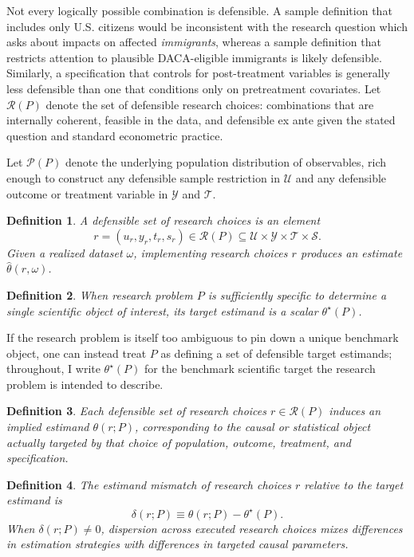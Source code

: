\documentclass[12pt]{article}
\newtheorem{definition}{Definition}
\newcommand{\R}{\mathcal{R}}
\newcommand{\Ps}{\mathcal{P}}
\begin{document}
Not every logically possible combination is defensible. A sample definition that includes only U.S. citizens would be inconsistent with the research question which asks about impacts on affected \textit{immigrants}, whereas a sample definition that restricts attention to plausible DACA-eligible immigrants is likely  defensible. Similarly, a specification that controls for post-treatment variables is generally less defensible than one that conditions only on pretreatment covariates. Let $\R(P)$ denote the set of defensible research choices: combinations that are internally coherent, feasible in the data, and defensible ex ante given the stated question and standard econometric practice.

Let $\Ps(P)$ denote the underlying population distribution of observables, rich enough to construct any defensible sample restriction in $\mathcal{U}$ and any defensible outcome or treatment variable in $\mathcal{Y}$ and $\mathcal{T}$.

\begin{definition}
A defensible set of research choices is an element
\[
r = (u_r, y_r, t_r, s_r) \in \R(P) \subseteq \mathcal{U} \times \mathcal{Y} \times \mathcal{T} \times \mathcal{S}.
\]
Given a realized dataset $\omega$, implementing research choices $r$ produces an estimate $\hat\theta(r, \omega)$.
\end{definition}

\begin{definition}
When research problem $P$ is sufficiently specific to determine a single scientific object of interest, its target estimand is a scalar $\theta^\star(P)$.
\end{definition}
If the research problem is itself too ambiguous to pin down a unique benchmark object, one can instead treat $P$ as defining a set of defensible target estimands; throughout, I write $\theta^\star(P)$ for the benchmark scientific target the research problem is intended to describe.

\begin{definition}
Each defensible set of research choices $r \in \R(P)$ induces an implied estimand $\theta(r;P)$, corresponding to the causal or statistical object actually targeted by that choice of population, outcome, treatment, and specification.
\end{definition}

\begin{definition}
The \emph{estimand mismatch} of research choices $r$ relative to the target estimand is
\[
\delta(r;P) \equiv \theta(r;P) - \theta^\star(P).
\]
When $\delta(r;P)\neq 0$, dispersion across executed research choices mixes differences in estimation strategies with differences in targeted causal parameters.
\end{definition}
\end{document}
